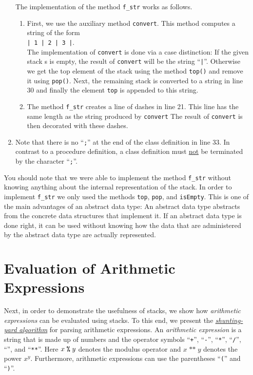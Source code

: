 \begin{enumerate}
      The implementation of the method \texttt{f\_str} works as follows.
      \begin{enumerate}
      \item First, we use the auxiliary method \texttt{convert}.  This method computes a string of
            the form \\[0.2cm]
            \hspace*{1.3cm} \texttt{| 1 | 2 | 3 |}. 
            \\[0.2cm]
            The implementation of \texttt{convert} is done via a case distinction:
            If the given stack s is empty, the result of \texttt{convert} will be the string ``\texttt{|}''.  
            Otherwise we get the top element of the stack using the method \texttt{top()} and remove
            it using \texttt{pop()}.  Next, the remaining stack is converted to a string in
            line 30 and finally the element \texttt{top} is appended to this string.
      \item The method \texttt{f\_str} creates a line of dashes in line 21.
            This line has the same length as the string produced by \texttt{convert}
            The result of \texttt{convert} is then decorated with these dashes.
      \end{enumerate}
\item Note that there is no ``\texttt{;}'' at the end of the class definition in line 33.
      In contrast to a procedure definition, a class definition must \underline{not} be terminated 
      by the character ``\texttt{;}''.
\end{enumerate}
You should note that we were able to implement  the method \texttt{f\_str} without knowing anything
about the internal representation of the stack.  In order to implement \texttt{f\_str} we only used
the methods \texttt{top}, \texttt{pop}, and \texttt{isEmpty}.  This is one of the main advantages of
an abstract data type: An abstract data type abstracts from the concrete data structures that
implement it.  If an abstract data type is done right, it can be used without knowing how the data
that are administered by the abstract data type are actually represented.


\section{Evaluation of Arithmetic Expressions}
Next, in order to demonstrate the usefulness of stacks, we show how \emph{arithmetic expressions} can be
evaluated using stacks.  To this end, we present the
\href{https://en.wikipedia.org/wiki/Shunting-yard_algorithm}{\emph{shunting-yard algorithm}} for
parsing arithmetic expressions.  
An \emph{arithmetic expression} is a string that is made up of numbers and
the operator symbols ``\texttt{+}'', ``\texttt{-}'', ``\texttt{*}'', ``\texttt{/}'',
``\texttt{}'', and ``\texttt{**}''. Here $x \;\texttt{\symbol{37}}\; y$ denotes the
modulus operator and $x\;\texttt{**}\;y$ denotes the power $x^y$.    Furthermore, arithmetic expressions can use
the parentheses ``\texttt{(}'' and ``\texttt{)}''.
  
